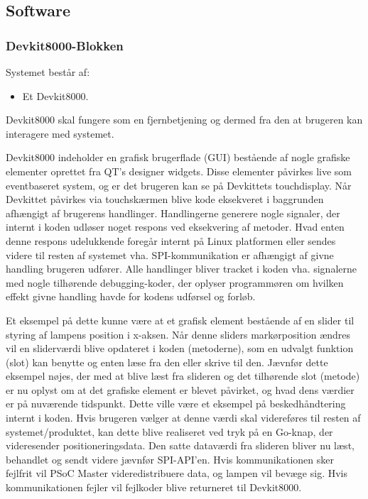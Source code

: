 \subsection{Software}

\subsubsection{Devkit8000-Blokken}

Systemet består af:
\begin{itemize}
	\item Et Devkit8000.
\end{itemize}

Devkit8000 skal fungere som en fjernbetjening og dermed fra den at brugeren kan interagere med systemet.

Devkit8000 indeholder en grafisk brugerflade (GUI) bestående af nogle grafiske elementer oprettet fra QT's designer widgets. Disse elementer påvirkes live som eventbaseret system, og er det brugeren kan se på Devkittets touchdisplay. Når Devkittet påvirkes via touchskærmen blive kode eksekveret i baggrunden afhængigt af brugerens handlinger. Handlingerne generere nogle signaler, der internt i koden udløser noget respons ved eksekvering af metoder. Hvad enten denne respons udelukkende foregår internt på Linux platformen eller sendes videre til resten af systemet vha. SPI-kommunikation er afhængigt af givne handling brugeren udfører. Alle handlinger bliver tracket i koden vha. signalerne med nogle tilhørende debugging-koder, der oplyser programmøren om hvilken effekt givne handling havde for kodens udførsel og forløb.

Et eksempel på dette kunne være at et grafisk element bestående af en slider til styring af lampens position i x-aksen. Når denne sliders markørposition ændres vil en sliderværdi blive opdateret i koden (metoderne), som en udvalgt funktion (slot) kan benytte og enten læse fra den eller skrive til den. Jævnfør dette eksempel nøjes, der med at blive læst fra slideren og det tilhørende slot (metode) er nu oplyst om at det grafiske element er blevet påvirket, og hvad dens værdier er på nuværende tidspunkt. Dette ville være et eksempel på beskedhåndtering internt i koden. Hvis brugeren vælger at denne værdi skal videreføres til resten af systemet/produktet, kan dette blive realiseret ved tryk på en Go-knap, der videresender positioneringsdata. Den satte dataværdi fra slideren bliver nu læst, behandlet og sendt videre jævnfør SPI-API'en. Hvis kommunikationen sker fejlfrit vil PSoC Master videredistribuere data, og lampen vil bevæge sig. Hvis kommunikationen fejler vil fejlkoder blive returneret til Devkit8000.

